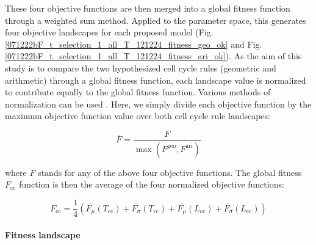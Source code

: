 These four objective functions are then merged into a global fitness function through a weighted sum method. Applied to the parameter space, this generates four objective landscapes for each proposed model (Fig. \ref{071222bF_t_selection_1_all_T_121224_fitness_geo_ok} and Fig. \ref{071222bF_t_selection_1_all_T_121224_fitness_ari_ok}). As the aim of this study is to compare the two hypothesized cell cycle rules (geometric and arithmetic) through a global fitness function, each landscape value is normalized to contribute equally to the global fitness function. Various methods of normalization can be used \cite{Marler:2004ha}. Here, we simply divide each objective function by the maximum objective function value over both cell cycle rule landscapes:

$$\overline{F} = \frac{F}{\max(F^{\mathrm{geo}}, F^{\mathrm{ari}})}$$

where $F$ stands for any of the above four objective functions. The global fitness $F_{\mathrm{cc}}$ function is then the average of the four normalized objective functions:

$$F_{\mathrm{cc}} = \frac{1}{4}\left(\overline{F_{\mu}}(T_{\mathrm{cc}}) + \overline{F_{\sigma}}(T_{\mathrm{cc}}) + \overline{F_{\mu}}(L_{\mathrm{cc}}) + \overline{F_{\sigma}}(L_{\mathrm{cc}})\right)$$

\paragraph{Fitness landscape}

